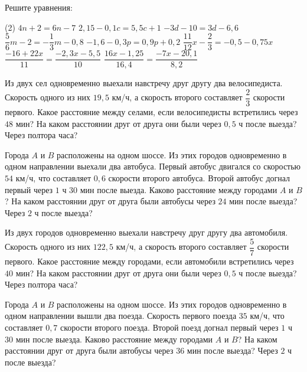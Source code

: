 \begin{class}[number=3]
	\begin{listofex}
		\item Решите уравнения: %
		\begin{tasks}(2)
			\task \( 4n+2=6n-7 \)
			\task \( 2,15-0,1c=5,5c+1 \)
			\task \( -3d-10=3d-6,6 \)
			\task \( \dfrac{ 5 }{ 6 }m-2=-\dfrac{ 1 }{ 3 }m-0,8 \)
			\task \( -1,6-0,3p=0,9p+0,2 \)
			\task \( \dfrac{ 11 }{ 12 }x-\dfrac{ 2 }{ 3 }=-0,5-0,75x \)
			\task \( \dfrac{ -16+22x }{ 11 }=\dfrac{ -2,3x-5,5 }{ 10 } \)
			\task \( \dfrac{ 16x-1,25 }{ 16,4 }=\dfrac{ -7x-20,1 }{ 8,2 } \)
		\end{tasks}
		\item Из двух сел одновременно выехали навстречу друг другу два велосипедиста. Скорость одного из них \(19,5\) км/ч, а скорость второго составляет \(\dfrac{ 2 }{ 3 }\) скорости первого. Какое расстояние между селами, если велосипедисты встретились через \(48\) мин? На каком расстоянии друг от друга они были через \(0,5\) ч после выезда? Через полтора часа?
		\item Города \(A\) и \(B\) расположены на одном шоссе. Из этих городов одновременно в одном направлении выехали два автобуса. Первый автобус двигался со скоростью \(54\) км/ч, что составляет \(0,6\) скорости второго автобуса. Второй автобус догнал первый через \(1\) ч \(30\) мин после выезда. Каково расстояние между городами \(A\) и \(B\)? На каком расстоянии друг от друга были автобусы через \(24\) мин после выезда? Через \(2\) ч после выезда?
		\item Из двух городов одновременно выехали навстречу друг другу два автомобиля. Скорость одного из них \(122,5\) км/ч, а скорость второго составляет \(\dfrac{ 5 }{ 7 }\) скорости первого. Какое расстояние между городами, если автомобили встретились через \(40\) мин? На каком расстоянии друг от друга они были через \(0,5\) ч после выезда? Через полтора часа?
		\item Города \(A\) и \(B\) расположены на одном шоссе. Из этих городов одновременно в одном направлении вышли два поезда. Скорость первого поезда \(35\) км/ч, что составляет \(0,7\) скорости второго поезда. Второй поезд догнал первый через \(1\) ч \(30\) мин после выезда. Каково расстояние между городами \(A\) и \(B\)? На каком расстоянии друг от друга были автобусы через \(36\) мин после выезда? Через \(2\) ч после выезда?
	\end{listofex}
\end{class}

